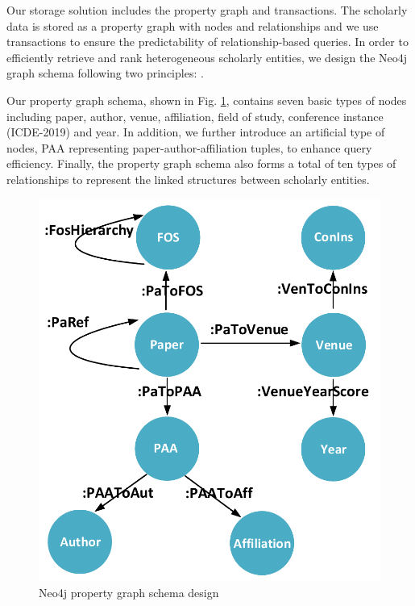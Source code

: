 Our storage solution includes the property graph and transactions. The scholarly data is stored as a property graph with nodes and relationships and we use transactions to ensure the predictability of relationship-based queries. 
In order to efficiently retrieve and rank heterogeneous scholarly entities, we design the Neo4j graph schema following two principles: .

Our property graph schema, shown in Fig. \ref{fig:schema}, contains seven basic types of nodes including paper, author, venue, affiliation, field of study, conference instance (\eg ICDE-2019) and year. In addition, we further introduce an artificial type of nodes, \ie PAA representing paper-author-affiliation tuples, to enhance query efficiency. Finally, the property graph schema also forms a total of ten types of relationships to represent the linked structures between scholarly entities.








\begin{figure}
\centering
\includegraphics[width=0.5\columnwidth]{neo4jSchema.pdf}
\caption{Neo4j property graph schema design}
\label{fig:schema}
\vspace{-3ex}
\end{figure}

